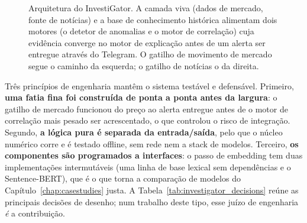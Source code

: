 \begin{figure}[ht]
\centering
{}
\caption[Arquitetura do sistema e fluxo de dados]{Arquitetura do InvestiGator. A camada viva (dados de
mercado, fonte de notícias) e a base de conhecimento histórica alimentam dois motores (o detetor de
anomalias e o motor de correlação) cuja evidência converge no motor de explicação antes de um alerta ser
entregue através do Telegram. O gatilho de movimento de mercado segue o caminho da esquerda; o gatilho de
notícias o da direita.}
\label{fig:architecture}
\end{figure}

Três princípios de engenharia mantêm o sistema testável e defensável. Primeiro, \textbf{uma fatia fina foi
construída de ponta a ponta antes da largura}: o gatilho de mercado funcionou do preço ao alerta entregue
antes de o motor de correlação mais pesado ser acrescentado, o que controlou o risco de integração.
Segundo, \textbf{a lógica pura é separada da entrada/saída}, pelo que o núcleo numérico corre e é testado
offline, sem rede nem a stack de modelos. Terceiro, \textbf{os componentes são programados a interfaces}: o
passo de embedding tem duas implementações intermutáveis (uma linha de base lexical sem dependências e o
Sentence-BERT), que é o que torna a comparação de modelos do Capítulo~\ref{chap:casestudies} justa. A
Tabela~\ref{tab:investigator_decisions} reúne as principais decisões de desenho; num trabalho deste tipo,
esse juízo de engenharia \emph{é} a contribuição.

